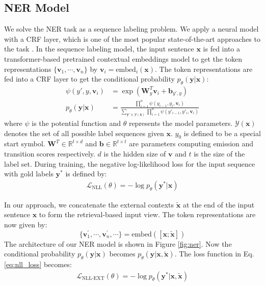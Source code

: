 \documentclass[11pt,a4paper]{article}
\def\vv{{\bm{v}}}
\def\vx{{\bm{x}}}
\def\vy{{\bm{y}}}
\def\sR{{\mathbb{R}}}
\newcommand{\mcL}{\mathcal{L}}
\newcommand{\Wvec}{\mathbf{W}}
\newcommand{\bvec}{\mathbf{b}}
\begin{document}
\subsection{NER Model}
We solve the NER task as a sequence labeling problem. We apply a neural model with a CRF layer, which is one of the most popular state-of-the-art approaches to the task \citep{lample-etal-2016-neural,ma-hovy-2016-end,akbik-etal-2019-pooled}. In the sequence labeling model, the input sentence $\vx$ is fed into a transformer-based pretrained contextual embeddings model to get the token representations $\{\vv_1, \cdots, \vv_n\}$ by $\vv_i {=} \text{embed}_i (\vx)$.
The token representations are fed into a CRF layer to get the conditional probability $p_\theta(\vy|\vx)$:
\begin{align}
    \psi(y', y, \vv_i) &= \exp(\Wvec_{y}^{T} \vv_i + \bvec_{y',y}) \label{eq:psi}\\
    p_\theta(\vy|\vx) &= \frac{\prod\limits_{i=1}^{n} \psi(y_{i-1}, y_i, \vv_i)}{\sum\limits_{\vy' \in \mathcal{Y}(\vx)} \prod\limits_{i=1}^{n} \psi(y'_{i-1}, y'_i, \vv_i)}\nonumber
\end{align}
where $\psi$ is the potential function and $\theta$ represents the model parameters. $\mathcal{Y}(\vx)$ denotes the set of all possible label sequences given $\vx$. $y_0$ is defined to be a special start symbol. $\Wvec^{T}\in \sR^{t\times d}$ and $\bvec \in \sR^{t \times t}$ are parameters computing emission and transition scores respectively. $d$ is the hidden size of $\vv$ and $t$ is the size of the label set. During training, the negative log-likelihood loss for the input sequence with gold labels $\vy^*$ is defined by:
\begin{align}
\mcL_{\text{NLL}}(\theta) = - \log p_\theta(\vy^*|\vx) \label{eq:nll_loss}
\end{align}

In our approach, we concatenate the external contexts $\tilde{\vx}$ at the end of the input sentence $\vx$ to form the retrieval-based input view. The token representations are now given by:
\begin{displaymath}
\{\vv_1^{\prime},\cdots,\vv^{\prime}_n,\cdots\} = \text{embed} ([\vx;\tilde{\vx}])
\end{displaymath}
The architecture of our NER model is shown in Figure \ref{fig:ner}. Now the conditional probability $p_\theta(\vy|\vx)$ becomes $p_\theta(\vy|\vx, \tilde{\vx})$. 
The loss function in Eq. \ref{eq:nll_loss} becomes:
\begin{align}
\mcL_{\text{NLL-EXT}}(\theta) = - \log p_\theta(\vy^*|\vx,\tilde{\vx}) \label{eq:nll_loss_x}
\end{align}
\end{document}
